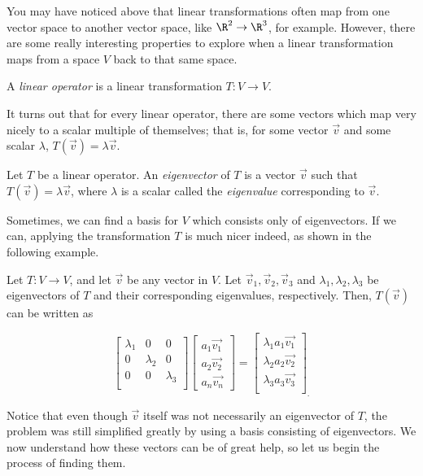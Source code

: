 \documentclass[letterpaper]{article}
\begin{document}
You may have noticed above that linear transformations often map from one vector space to another vector space, like $\R^2 \to \R^3$, for example. However, there are some really interesting properties to explore when a linear transformation maps from a space $V$ back to that same space. 
\begin{definition}
A \emph{linear operator} is a linear transformation $T: V \to V$.
\end{definition}
It turns out that for every linear operator, there are some vectors which map very nicely to a scalar multiple of themselves; that is, for some vector $\vec{v}$ and some scalar $\lambda$, $T(\vec{v})=\lambda\vec{v}$.
\begin{definition}
Let $T$ be a linear operator. An \emph{eigenvector} of $T$ is a vector $\vec{v}$ such that $T(\vec{v})=\lambda\vec{v}$, where $\lambda$ is a scalar called the \emph{eigenvalue} corresponding to $\vec{v}$.
\end{definition}
Sometimes, we can find a basis for $V$ which consists only of eigenvectors. If we can, applying the transformation $T$ is much nicer indeed, as shown in the following example. 
\begin{example}
Let $T:V \to V$, and let $\vec{v} $ be any vector in $V$. Let $\vec{v}_1, \vec{v}_2, \vec{v}_3$ and $\lambda_1, \lambda_2, \lambda_3$ be eigenvectors of $T$ and their corresponding eigenvalues, respectively. Then, $T(\vec{v})$ can be written as 

\[
\left[ \begin{array}{ccc}
\lambda_1 & 0 & 0 \\
0 & \lambda_2 & 0 \\
0 & 0 & \lambda_3 \\
\end{array} \right]
%
\left[ \begin{array}{c}
a_1\vec{v_1} \\
a_2\vec{v_2} \\ 
a_n\vec{v_n}
\end{array} \right]
%
=
%
\left[ \begin{array}{c}
\lambda_1a_1\vec{v_1} \\
\lambda_2a_2\vec{v_2} \\
\lambda_3a_3\vec{v_3} \\
\end{array} \right]_.
\]
\end{example}

Notice that even though $\vec{v}$ itself was not necessarily an eigenvector of $T$, the problem was still simplified greatly by using a basis consisting of eigenvectors. We now understand how these vectors can be of great help, so let us begin the process of finding them.
\end{document}
